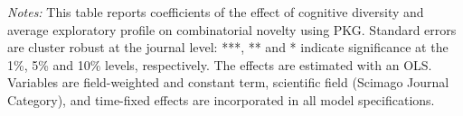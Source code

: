 \begin{table}[h!]
{\begin{threeparttable}
\begin{tabular}{@{\extracolsep{25pt}}lD{.}{.}{-3} D{.}{.}{-3} D{.}{.}{-3} D{.}{.}{-3} }
\end{tabular} 
\begin{tablenotes}
 \footnotesize
 \justifying \item {\it Notes:}
 This table reports coefficients of the effect of cognitive diversity and average exploratory profile on combinatorial novelty using PKG. Standard errors are cluster robust at the journal level: ***, ** and * indicate significance at the 1\%, 5\% and 10\% levels, respectively. The effects are estimated with an OLS. Variables are field-weighted and constant term, scientific field (Scimago Journal Category), and time-fixed effects are incorporated in all model specifications.
 \end{tablenotes}
 \end{threeparttable}
 }
\label{mesh_cog_nov_fw_pkg}
\end{table} 